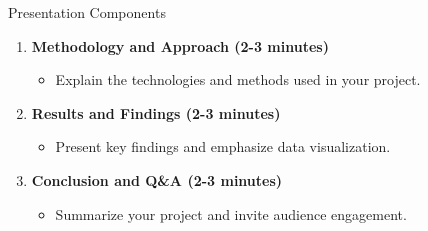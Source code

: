 \documentclass[aspectratio=169]{beamer}
\begin{document}
\begin{frame}[fragile]
\begin{block}{Presentation Components}
\begin{enumerate}
            \item \textbf{Methodology and Approach (2-3 minutes)}
                \begin{itemize}
                    \item Explain the technologies and methods used in your project.
                \end{itemize}
                
            \item \textbf{Results and Findings (2-3 minutes)}
                \begin{itemize}
                    \item Present key findings and emphasize data visualization.
                \end{itemize}
                
            \item \textbf{Conclusion and Q\&A (2-3 minutes)}
                \begin{itemize}
                    \item Summarize your project and invite audience engagement.
                \end{itemize}
        \end{enumerate}
    \end{block}
\end{frame}
\end{document}
